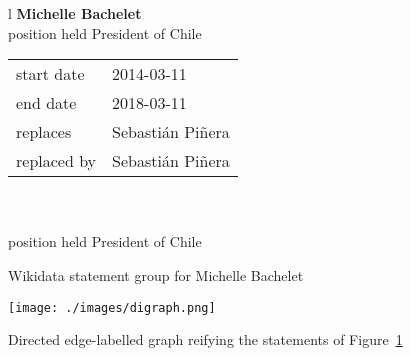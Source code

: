 
\begin{figure}[tb]
\centering
{\sf
\begin{tabular}{l}
\large\textbf{Michelle Bachelet}\\[1ex]
\large\qquad position held \quad President of Chile\\
\qquad \qquad 
{\begin{tabular}{l@{\qquad~~}l}
start date \wid{P580} & 2014-03-11\\
end date \wid{P582} 	& 2018-03-11\\
replaces\wid{P155}	& Sebastián Piñera\wid{Q306}\\
replaced by\wid{P156} & Sebastián Piñera\wid{Q306}\\
\end{tabular}}\\
\\[-1ex]
\large\qquad position held \quad President of Chile\\
\qquad {}
\end{tabular}
}
\caption{Wikidata statement group for Michelle Bachelet \label{fig:mb}}
\end{figure}


\begin{figure}[t]
\centering
\texttt{[image: ./images/digraph.png]}
\caption{Directed edge-labelled graph reifying the statements of Figure~\ref{fig:mb} \label{fig:delg}}
\end{figure}


